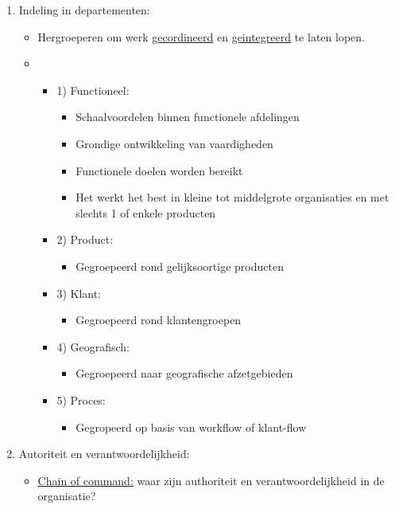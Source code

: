 \documentclass[12pt]{article}
\begin{document}
\begin{enumerate}
    \item Indeling in departementen:\begin{itemize}
        \item Hergroeperen om werk \underline{gecordineerd} en \underline{geintegreerd} te laten lopen.
        \item[] \begin{itemize}
            \item[] 1) Functioneel:\begin{itemize}
                \item Schaalvoordelen binnen functionele afdelingen
                \item Grondige ontwikkeling van vaardigheden
                \item Functionele doelen worden bereikt 
                \item Het werkt het best in kleine tot middelgrote organisaties en met slechts 1 of enkele producten
            \end{itemize}
            \item[] 2) Product:\begin{itemize}
                \item Gegroepeerd rond gelijksoortige producten
            \end{itemize}
            \item[] 3) Klant:\begin{itemize}
                \item Gegroepeerd rond klantengroepen
            \end{itemize}
            \item[] 4) Geografisch:\begin{itemize}
                \item Gegroepeerd naar geografische afzetgebieden
            \end{itemize}
            \item[] 5) Proces:\begin{itemize}
                \item Gegropeerd op basis van workflow of klant-flow
            \end{itemize}
        \end{itemize}
    \end{itemize}
    \item Autoriteit en verantwoordelijkheid:\begin{itemize}
        \item \underline{Chain of command:} waar zijn authoriteit en verantwoordelijkheid in de organisatie?

\end{itemize}
\end{enumerate}
\end{document}
